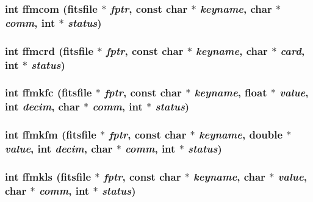 \subsubsection{\setlength{\rightskip}{0pt plus 5cm}int ffmcom (\bf{fitsfile} $\ast$ {\em fptr}, const char $\ast$ {\em keyname}, char $\ast$ {\em comm}, int $\ast$ {\em status})}\label{src_2fitsio_8h_e21b2574f5fb36c2e208473ec81c6f18}


\subsubsection{\setlength{\rightskip}{0pt plus 5cm}int ffmcrd (\bf{fitsfile} $\ast$ {\em fptr}, const char $\ast$ {\em keyname}, char $\ast$ {\em card}, int $\ast$ {\em status})}\label{src_2fitsio_8h_0fb8a002759b6bdaa863bb456a57ad93}


\subsubsection{\setlength{\rightskip}{0pt plus 5cm}int ffmkfc (\bf{fitsfile} $\ast$ {\em fptr}, const char $\ast$ {\em keyname}, float $\ast$ {\em value}, int {\em decim}, char $\ast$ {\em comm}, int $\ast$ {\em status})}\label{src_2fitsio_8h_633909c19524d20d0f757d3454a079ca}


\subsubsection{\setlength{\rightskip}{0pt plus 5cm}int ffmkfm (\bf{fitsfile} $\ast$ {\em fptr}, const char $\ast$ {\em keyname}, double $\ast$ {\em value}, int {\em decim}, char $\ast$ {\em comm}, int $\ast$ {\em status})}\label{src_2fitsio_8h_61e22f498132381f2531f83d38d73928}


\subsubsection{\setlength{\rightskip}{0pt plus 5cm}int ffmkls (\bf{fitsfile} $\ast$ {\em fptr}, const char $\ast$ {\em keyname}, char $\ast$ {\em value}, char $\ast$ {\em comm}, int $\ast$ {\em status})}\label{src_2fitsio_8h_0aa39e70d811c97a58750827ab3ad201}


